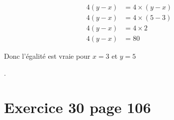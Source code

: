 \documentclass[12pt,a4paper]{article}
\begin{document}
\begin{enumerate}
\begin{multicols}{2}
		\begin{align*}
			4(y - x) &= 4 \times (y - x) \\
			4(y - x) &= 4 \times (5 - 3) \\
			4(y - x) &= 4 \times 2 \\
			4(y - x) &= 80 
		\end{align*}
	\end{multicols}
	
	Donc l'égalité est vraie pour $x=3$ et $y=5$
	
	.
\end{enumerate}
	
	
\section*{Exercice 30 page 106}
\end{document}
